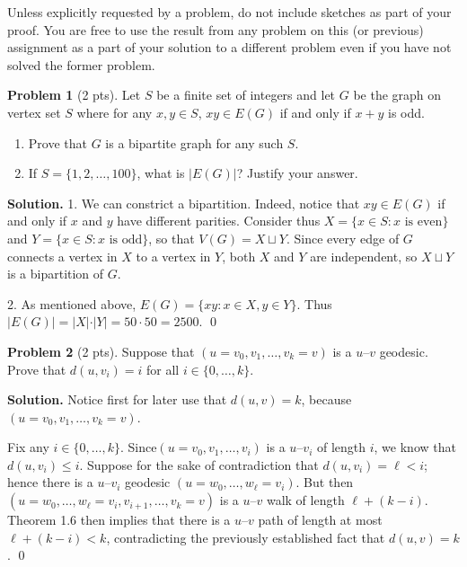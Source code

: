 \documentclass[11pt]{scrartcl}
\theoremstyle{definition}
\newtheorem{problem}{Problem}
\newenvironment{solution}{\noindent\textbf{Solution.}}{\qed}
\newcommand*{\abs}[1]{\lvert #1\rvert}     %
\begin{document}
\noindent  Unless explicitly requested by a problem, do not include sketches as part of your proof.
You are free to use the result from any problem on this (or previous) assignment as a part of your solution to a different problem even if you have not solved the former problem.

\vskip10pt

\begin{problem}[2 pts]
Let $S$ be a finite set of integers and let $G$ be the graph on vertex set $S$ where for any $x,y\in S$, $xy\in E(G)$ if and only if $x+y$ is odd.
\begin{enumerate}
\item Prove that $G$ is a bipartite graph for any such $S$.
\item If $S=\{1, 2, \dots, 100\}$, what is $\abs{E(G)}$? Justify your answer.
\end{enumerate}
\end{problem}

\begin{solution}
1. We can constrict a bipartition. Indeed, notice that $xy\in E(G)$ if and only if $x$ and $y$ have different parities. Consider thus $X=\{x\in S\colon x \text { is even}\}$ and $Y=\{x\in S\colon x \text { is odd}\}$, so that $V(G)=X\sqcup Y$. Since every edge of $G$ connects a vertex in $X$ to a vertex in $Y$, both $X$ and $Y$ are independent, so $X\sqcup Y $ is a bipartition of $G$.

2. As mentioned above, $E(G)=\{xy\colon x \in X, y \in Y\}$. Thus $\vert E(G)\vert = \vert X \vert \cdot \vert Y \vert=50 \cdot 50 = 2500$. 
\end{solution}

\hrulefill
\begin{problem}[2 pts] 
Suppose that $(u=v_0,v_1,\dots,v_k=v)$ is a $u$--$v$ geodesic.
Prove that $d(u,v_i)=i$ for all $i\in\{0,\dots,k\}$.
\end{problem}
\begin{solution}
Notice first for later use that $d(u,v)=k$, because $(u=v_0,v_1,\dots,v_k=v)$.

Fix any $i\in\{0,\dots,k\}$. Since$(u=v_0,v_1,\dots,v_i)$ is a $u$--$v_i$ of length $i$, we know that $d(u,v_i)\leq i$. Suppose for the sake of contradiction that  $d(u,v_i)=\ell< i$; hence there is a $u$--$v_i$ geodesic $(u = w_0,\dots,w_\ell = v_i)$. But then $(u = w_0,\dots,w_\ell = v_i, v_{i+1},\dots,v_k= v)$ is a $u$--$v$ walk of length $\ell+(k-i)$.  Theorem 1.6 then implies that there is a $u$--$v$ path of length at most $\ell+(k-i)<k$, contradicting the previously established fact that $d(u, v) = k$.
\end{solution}
\end{document}
